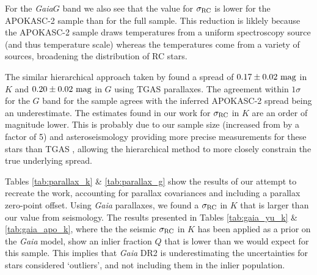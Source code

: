 \documentclass[fleqn,usenatbib]{mnras}
\newcommand{\murc}{\mbox{$\mu_{\rm RC}$}\xspace}
\newcommand{\sigrc}{\mbox{$\sigma_{\rm RC}$}\xspace}
\newcommand{\gaia}{\emph{Gaia}\xspace}
\newcommand{\new}[1]{#1}
\newcommand{\nnew}[1]{#1}
\begin{document}
For the \gaia $G$ band we also see that the value for \sigrc is lower for the APOKASC-2 sample than for the full  sample. This reduction is liklely because the APOKASC-2 sample draws temperatures from a uniform spectroscopy source (and thus temperature scale) whereas the  temperatures come from a variety of sources, broadening the distribution of RC stars.


The similar hierarchical approach taken by  found a spread of $0.17 \pm 0.02\ \rm mag$ in $K$ and $0.20 \pm 0.02\ \rm mag$ in $G$ using TGAS parallaxes. \new{The agreement within $1\sigma$ for the $G$ band for the \citetalias{art:yu+2018} sample agrees with the inferred APOKASC-2 spread being an underestimate}. The estimates found in our work for \sigrc in $K$ are an order of magnitude lower. This is probably due to our sample size (increased from  by a factor of 5) and asteroseismology providing more precise measurements for these stars than TGAS \citep{art:davies+2017}, allowing the hierarchical method to more closely constrain the true underlying spread.

Tables \ref{tab:parallax_k} \& \ref{tab:parallax_g} show the results of our attempt to recreate the  work, accounting for parallax covariances and including a parallax zero-point offset. \nnew{Using \gaia parallaxes, we found a \sigrc in $K$ that is larger than our value from seismology. The results presented in Tables \ref{tab:gaia_yu_k} \& \ref{tab:gaia_apo_k}, where the the seismic \sigrc in $K$ has been applied as a prior on the \gaia model, show an inlier fraction $Q$ that is lower than we would expect for this sample. This implies that \gaia DR2 is underestimating the uncertainties for stars considered `outliers', and not including them in the inlier population.}
\end{document}
